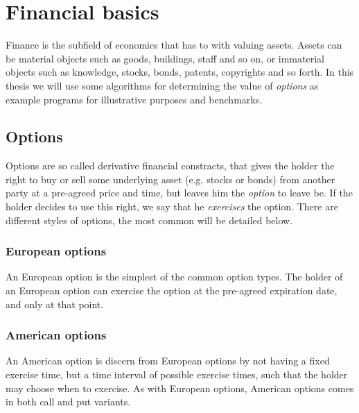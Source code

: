 \chapter{Financial basics}
Finance is the subfield of economics that has to with valuing
assets. Assets can be material objects such as goods, buildings, staff
and so on, or immaterial objects such as knowledge, stocks, bonds,
patents, copyrights and so forth. In this thesis we will use some
algorithms for determining the value of \textit{options} as example
programs for illustrative purposes and benchmarks.

\section{Options}
Options are so called derivative financial constracts, that gives the
holder the right to buy or sell some underlying asset (e.g. stocks or
bonds) from another party at a pre-agreed price and time, but leaves
him the \textit{option} to leave be. If the holder decides to use this
right, we say that he \textit{exercises} the option. There are
different styles of options, the most common will be detailed below.

\subsection{European options}
An European option is the simplest of the common option types. The
holder of an European option can exercise the option at the pre-agreed
expiration date, and only at that point.





\subsection{American options}
An American option is discern from European options by not having a
fixed exercise time, but a time interval of possible exercise times,
such that the holder may choose when to exercise. As with European
options, American options comes in both call and put variants.


